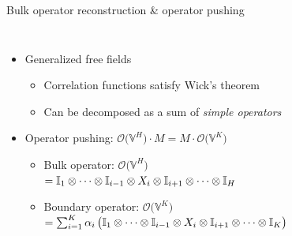 \documentclass{fdubeamer}
\begin{document}
\begin{frame}{Bulk operator reconstruction \& operator pushing}

\begin{columns}[c]


    \begin{itemize}
      \item Generalized free fields

        \begin{itemize}
          \item Correlation functions satisfy Wick's theorem
          \item Can be decomposed as a sum of \emph{simple operators}
        \end{itemize}

      \item Operator pushing: $\mathcal{O} \bigl( \mathbb{V}^H \bigr) \cdot M = M \cdot \mathcal{O} \bigl( \mathbb{V}^K \bigr)$
        \begin{itemize}
          \item Bulk operator: $\mathcal{O} \bigl( \mathbb{V}^H \bigr)$ \\
            \mbox{\quad}
            $
              = \mathbb{I}_1 \otimes \cdots \otimes \mathbb{I}_{i-1} \otimes X_i \otimes \mathbb{I}_{i+1} \otimes \dots \otimes \mathbb{I}_{H}
            $
          \item Boundary operator: $\mathcal{O} \bigl( \mathbb{V}^K \bigr)$ \\
            \mbox{\quad}
            $
              = \sum_{i=1}^K \alpha_i \, \bigl(
                  \mathbb{I}_1 \otimes \cdots \otimes \mathbb{I}_{i-1} \otimes X_i \otimes \mathbb{I}_{i+1} \otimes \dots \otimes \mathbb{I}_{K}
                \bigr)
            $
        \end{itemize}
    \end{itemize}


    \begin{center}
      \scriptsize
      \tikzset{x=1em, y=1em, node font=\tiny}
    \end{center}

\end{columns}


\end{frame}
\end{document}
